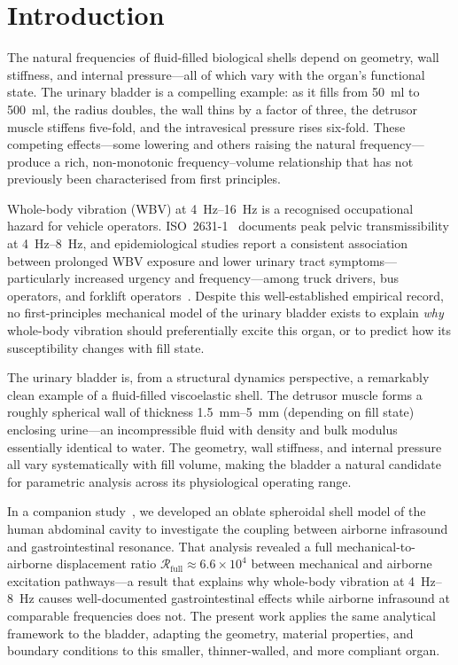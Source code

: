 \section{Introduction}
\label{sec:introduction}

The natural frequencies of fluid-filled biological shells depend on geometry,
wall stiffness, and internal pressure---all of which vary with the organ's
functional state.  The urinary bladder is a compelling example: as it fills
from \SI{50}{\milli\litre} to \SI{500}{\milli\litre}, the radius doubles,
the wall thins by a factor of three, the detrusor muscle stiffens five-fold,
and the intravesical pressure rises six-fold.  These competing effects---some
lowering and others raising the natural frequency---produce a rich,
non-monotonic frequency--volume relationship that has not previously been
characterised from first principles.

Whole-body vibration (WBV) at \SIrange{4}{16}{\hertz} is a recognised
occupational hazard for vehicle operators.  ISO~2631-1~\cite{iso2631}
documents peak pelvic transmissibility at \SIrange{4}{8}{\hertz}, and
epidemiological studies report a consistent association between prolonged WBV
exposure and lower urinary tract symptoms---particularly increased urgency and
frequency---among truck drivers, bus operators, and forklift
operators~\cite{Seidel1986,Griffin1990}.  Despite this well-established
empirical record, no first-principles mechanical model of the urinary bladder
exists to explain \emph{why} whole-body vibration should preferentially excite
this organ, or to predict how its susceptibility changes with fill state.

The urinary bladder is, from a structural dynamics perspective, a remarkably
clean example of a fluid-filled viscoelastic shell.  The detrusor muscle forms
a roughly spherical wall of thickness \SIrange{1.5}{5}{\milli\metre}
(depending on fill state) enclosing urine---an incompressible fluid with
density and bulk modulus essentially identical to water.  The geometry, wall
stiffness, and internal pressure all vary systematically with fill volume,
making the bladder a natural candidate for parametric analysis across its
physiological operating range.

In a companion study~\cite{Mace2026browntone}, we developed an oblate
spheroidal shell model of the human abdominal cavity to investigate the
coupling between airborne infrasound and gastrointestinal resonance.  That
analysis revealed a full mechanical-to-airborne displacement ratio
$\mathcal{R}_\mathrm{full} \approx 6.6 \times 10^4$
between mechanical and airborne excitation pathways---a result that explains
why whole-body vibration at \SIrange{4}{8}{\hertz} causes well-documented
gastrointestinal effects while airborne infrasound at comparable frequencies
does not.  The present work applies the same analytical framework to the
bladder, adapting the geometry, material properties, and boundary conditions to
this smaller, thinner-walled, and more compliant organ.

